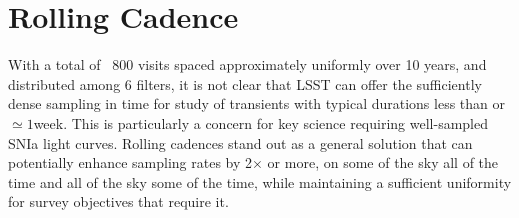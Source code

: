 

%

%
%
%
%
%
%

\section{ Rolling Cadence }
\def\secname{rolling}\label{sec:\secname}



With a total of ~800 visits spaced approximately uniformly over 10 years, and distributed among 6 filters,
it is not clear that LSST can offer the sufficiently dense sampling in time for study of transients with typical durations less than or $\simeq 1$week.
This is particularly a concern for key science requiring well-sampled SNIa light curves.  Rolling cadences stand out as a
general solution that can potentially enhance sampling rates by 2$\times$ or more, on some of the sky all of the time and all of the sky some of the time, while maintaining a sufficient uniformity for survey objectives that require it.

